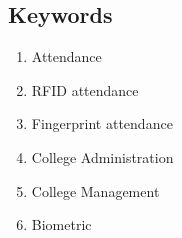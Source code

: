 \subsection{Keywords}
   \begin{enumerate}
       \item Attendance
       \item RFID attendance
       \item Fingerprint attendance
       \item College Administration
       \item College Management
       \item Biometric
   \end{enumerate}